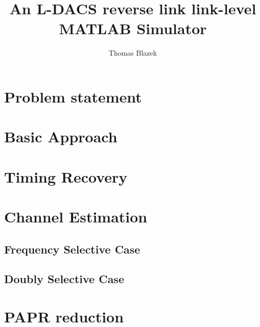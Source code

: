 \documentclass{article}
\author{Thomas Blazek}
\title{An L-DACS reverse link link-level MATLAB Simulator}
\begin{document}
\maketitle{}
\newpage
\tableofcontents
\newpage
\section{Problem statement}

\section{Basic Approach}

\section{Timing Recovery}

\section{Channel Estimation}

\subsection{Frequency Selective Case}


\subsection{Doubly Selective Case}

\section{PAPR reduction}
\end{document}
